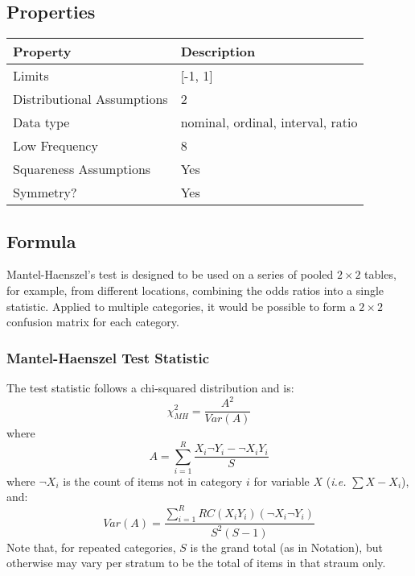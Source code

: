 \documentclass[11pt]{article}
\begin{document}
\subsection{Properties}
\begin{tabular}{| l || l |}
    \hline
    {\bf Property} & {\bf Description} \\
    \hline
    Limits & [-1, 1] \\ \hline

    Distributional Assumptions& 2 \\ \hline

    Data type & nominal, ordinal, interval, ratio \\ \hline

    Low Frequency & 8 \\ \hline

    Squareness Assumptions & Yes \\ \hline
    
    Symmetry? & Yes \\ \hline

\end{tabular}


\subsection{Formula}

Mantel-Haenszel's test is designed to be used on a series of pooled $2\times 2$ tables, for example, from different locations, combining the odds ratios into a single statistic.  Applied to multiple categories, it would be possible to form a $2\times 2$ confusion matrix for each category.

\subsubsection{Mantel-Haenszel Test Statistic}
The test statistic follows a chi-squared distribution and is:
$$
\chi^2_{MH} = \frac{ A^2 }{ Var(A) }
$$
where
$$
A = \sum_{i=1}^{R}{  \frac{  X_i ¬Y_i  -  ¬X_i Y_i }{ S }  }
$$
where $¬X_i$ is the count of items not in category $i$ for variable $X$ (\textsl{i.e.} $\sum{X} - X_i$), and:
$$
Var(A) = \frac{   \sum_{i=1}^{R}{  R C (X_i Y_i) (¬X_i ¬Y_i) }  }{  S^2(S - 1)  }
$$
Note that, for repeated categories, $S$ is the grand total (as in Notation), but otherwise may vary per stratum to be the total of items in that straum only.
\end{document}
